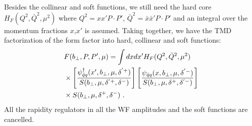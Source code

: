 Besides the collinear and soft functions, we still need the hard core $H_F(Q^2,\bar Q^2,\mu^2)$ where $Q^2=xx'P\cdot P'$, $\bar Q^2=\bar x\bar x' P\cdot P'$ and an integral over the momentum fractions $x$,$x'$ is assumed. Taking together, we have the TMD factorization of the form factor into hard, collinear and soft functions:
\begin{align}\label{eq:form_fac_bare}
	&F(b_\perp,P,P',\mu)=\int dx dx' H_F(Q^2,\bar Q^2,\mu^2) \\ &\times \left[\frac{\psi_{\bar q q}^{\dagger}(x',b_\perp,\mu,\delta^{'+})}{S(b_\perp,\mu,\delta^{'+},\delta^-)}\right]\left[\frac{\psi_{\bar q q}(x,b_\perp,\mu,\delta^{'-})}{S(b_\perp,\mu,\delta^+,\delta^{'-})}\right]\nonumber \\
	&\times S(b_\perp,\mu,\delta^+,\delta^-) \ . \nonumber
\end{align}
All the rapidity regulators in all the WF amplitudes and the soft functions are cancelled.

